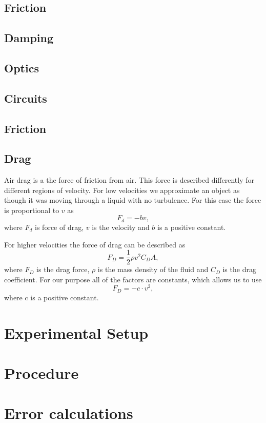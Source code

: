 \documentclass[11pt, a4paper]{article}
\begin{document}
\subsection{Friction}

\subsection{Damping}

\subsection{Optics}
\subsection{Circuits}
\subsection{Friction}
\subsection{Drag}
Air drag is a the force of friction from air. This force is described differently for different regions of velocity. 
For low velocities we approximate an object as though it was moving through a liquid with no turbulence.
For this case the force is proportional to $v$ as
\[
F_d = -bv,
\]
where $F_d$ is force of drag, $v$ is the velocity and $b$ is a positive constant. 

For higher velocities the force of drag can be described as
\[
 F_D = \frac{1}{2}\rho v^2 C_D A,
\]
where $F_D$ is the drag force, $\rho$ is the mass density of the fluid and $C_D$ is the drag coefficient.
For our purpose all of the factors are constants, which allows us to use
\[
 F_D = -c\cdot v^2,
\]
where c is a positive constant.

\section{Experimental Setup}
\section{Procedure}

\section{Error calculations}
\end{document}
